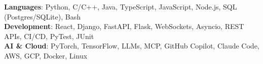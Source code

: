 \begin{itemize}[leftmargin=0.15in, label={}]
    \small{\item{
     \textbf{Languages}{: Python, C/C++, Java, TypeScript, JavaScript, Node.js, SQL (Postgres/SQLite), Bash} \\
     \textbf{Development}{: React, Django, FastAPI, Flask, WebSockets, Asyncio, REST APIs, CI/CD, PyTest, JUnit} \\
     \textbf{AI \& Cloud}{: PyTorch, TensorFlow, LLMs, MCP, GitHub Copilot, Claude Code, AWS, GCP, Docker, Linux}
    }}
\end{itemize}